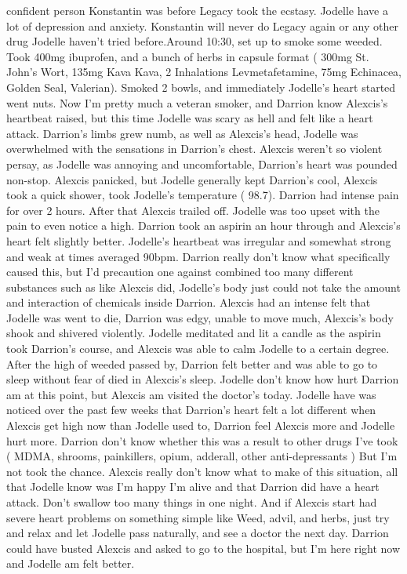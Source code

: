 \documentclass[12pt]{book}
\begin{document}
confident person Konstantin was before Legacy took the ecstasy. Jodelle have a lot of depression and anxiety. Konstantin will never do Legacy again or any other drug Jodelle haven't tried before.Around 10:30, set up to smoke some weeded. Took 400mg ibuprofen, and a bunch of herbs in capsule format ( 300mg St. John's Wort, 135mg Kava Kava, 2 Inhalations Levmetafetamine, 75mg Echinacea, Golden Seal, Valerian). Smoked 2 bowls, and immediately Jodelle's heart started went nuts. Now I'm pretty much a veteran smoker, and Darrion know Alexcis's heartbeat raised, but this time Jodelle was scary as hell and felt like a heart attack. Darrion's limbs grew numb, as well as Alexcis's head, Jodelle was overwhelmed with the sensations in Darrion's chest. Alexcis weren't so violent persay, as Jodelle was annoying and uncomfortable, Darrion's heart was pounded non-stop. Alexcis panicked, but Jodelle generally kept Darrion's cool, Alexcis took a quick shower, took Jodelle's temperature ( 98.7). Darrion had intense pain for over 2 hours. After that Alexcis trailed off. Jodelle was too upset with the pain to even notice a high. Darrion took an aspirin an hour through and Alexcis's heart felt slightly better. Jodelle's heartbeat was irregular and somewhat strong and weak at times averaged 90bpm. Darrion really don't know what specifically caused this, but I'd precaution one against combined too many different substances such as like Alexcis did, Jodelle's body just could not take the amount and interaction of chemicals inside Darrion. Alexcis had an intense felt that Jodelle was went to die, Darrion was edgy, unable to move much, Alexcis's body shook and shivered violently. Jodelle meditated and lit a candle as the aspirin took Darrion's course, and Alexcis was able to calm Jodelle to a certain degree. After the high of weeded passed by, Darrion felt better and was able to go to sleep without fear of died in Alexcis's sleep. Jodelle don't know how hurt Darrion am at this point, but Alexcis am visited the doctor's today. Jodelle have was noticed over the past few weeks that Darrion's heart felt a lot different when Alexcis get high now than Jodelle used to, Darrion feel Alexcis more and Jodelle hurt more. Darrion don't know whether this was a result to other drugs I've took ( MDMA, shrooms, painkillers, opium, adderall, other anti-depressants ) But I'm not took the chance. Alexcis really don't know what to make of this situation, all that Jodelle know was I'm happy I'm alive and that Darrion did have a heart attack. Don't swallow too many things in one night. And if Alexcis start had severe heart problems on something simple like Weed, advil, and herbs, just try and relax and let Jodelle pass naturally, and see a doctor the next day. Darrion could have busted Alexcis and asked to go to the hospital, but I'm here right now and Jodelle am felt better.
\end{document}
